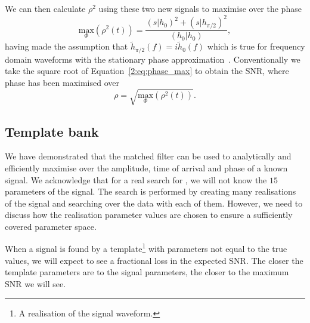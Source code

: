 We can then calculate $\rho^{2}$ using these two new signals to maximise over the phase
%
\begin{equation}
    \underset{\Phi}{\text{max}}(\rho^{2}(t)) = \frac{(s|h_{0})^{2} + (s|h_{\pi/2})^2}{(h_{0}|h_{0})},
    \label{2:eq:phase_max}
\end{equation}
%
having made the assumption that $\tilde{h}_{\pi/2}(f) = i\tilde{h}_{0}(f)$ which is true for frequency domain waveforms with the stationary phase approximation~\cite{Droz:1999}. Conventionally we take the square root of Equation~\ref{2:eq:phase_max} to obtain the SNR, where phase has been maximised over
\begin{equation}
    \rho = \sqrt{\underset{\Phi}{\text{max}}(\rho^{2}(t))}.
\end{equation}

\subsection{\label{2:sec:template-bank}Template bank}

We have demonstrated that the matched filter can be used to analytically and efficiently maximise over the amplitude, time of arrival and phase of a known signal. We acknowledge that for a real search for \gws, we will not know the $15$ parameters of the signal. The search is performed by creating many realisations of the \gwadj signal and searching over the data with each of them. However, we need to discuss how the realisation parameter values are chosen to ensure a sufficiently covered parameter space.

When a signal is found by a template\footnote{A realisation of the \gwadj signal waveform.} with parameters not equal to the true values, we will expect to see a fractional loss in the expected SNR. The closer the template parameters are to the signal parameters, the closer to the maximum SNR we will see. 

